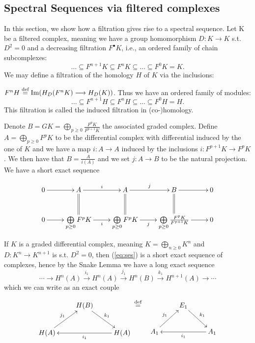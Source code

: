 \documentclass[../main.tex]{subfiles}
\begin{document}
\subsection{Spectral Sequences via filtered complexes} \label{sect_SpSeqfilt}

In this section, we show how a filtration gives rise to a spectral sequence. Let K be a filtered complex, meaning we have a group homomorphism $D\colon K\to K$ s.t. $D^2 = 0$ and  a decreasing filtration $F^\bullet K$, i.e., an ordered family of chain subcomplexes:
\[
\ldots \subseteq F^{n+1}K\subseteq F^nK\subseteq \ldots \subseteq F^0K = K.
\]
We may define a filtration of the homology $H$ of $K$ via the inclusions: 

$F^nH \stackrel{\text{def}}{=} \operatorname{Im}(H_D(F^nK)\longrightarrow H_D(K))$. Thus we have an ordered family of modules:
\[
\ldots \subseteq F^{n+1}H\subseteq F^nH\subseteq \ldots \subseteq F^0H = H.
\]
This filtration is called the induced filtration in (co-)homology.

Denote $B = GK =  \bigoplus\limits_{p \geq 0}\frac{F^pK}{F^{p+1}K}$ the associated graded complex. Define $A = \bigoplus_{p \geq 0}{F^pK} $ to be the differential complex with differential induced by the one of $K$ and we have a map $i \colon A \to A$ induced by the inclusions $i \colon F^{p+1}K \to F^pK$. We then have that $B = \frac{A}{i(A)}$ and we set $j \colon A \to B$ to be the natural projection. We have a short exact sequence 

\begin{equation}\label{eq:ses}
\xymatrix{
  0 \ar[r] & A \ar@{=}[d] \ar[r]^-{i} & A \ar@{=}[d]  \ar[r]^-{j} & B \ar@{=}[d] \ar[r] & 0 \\ 
  0 \ar[r] & \bigoplus\limits_{p \geq 0}{F^pK} \ar[r]_-{i} & \bigoplus\limits_{p \geq 0}{F^pK} \ar[r]_-{j} &  \bigoplus\limits_{p \geq 0}\frac{F^pK}{F^{p+1}K} \ar[r] & 0
}
\end{equation}


If $K$ is a graded differential complex, meaning $K= \bigoplus\limits_{n \geq 0}K^n$ and $D \colon K^n \to K^{n+1}$ is s.t. $D^2 = 0$, then (\ref{eq:ses}) is a short exact sequence of complexes, hence by the Snake Lemma we have a long exact sequence 
\[
\cdots \to   H^n(A) \xrightarrow {i_1} H^n(A) \xrightarrow {j_1}  H^n(B) \xrightarrow {k_1} H^{n+1}(A) \to \cdots
\]
which we can write as an exact couple 

\begin{eqnarray} \label{exactcouple}
  \xymatrix{
&H(B) \ar[rd]^{k_1}& \\
H(A)\ar[ur]^{j_1}&& H(A)\ar[ll]^{i_1} 
} & \defeq & 
  \xymatrix{
&E_1 \ar[rd]^{k_1}& \\
A_1\ar[ur]^{j_1}&& A_1\ar[ll]^{i_1} 
}
\end{eqnarray}
\end{document}
